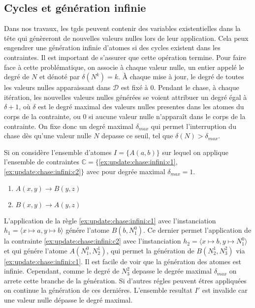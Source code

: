 \subsection{Cycles et génération infinie}
\label{sec:update:chase:infini}
Dans nos travaux, les \glspl{tgd} peuvent contenir des variables existentielles dans la tête qui génèreront de nouvelles valeurs nulles lors de leur application.
Cela peux engendrer une génération infinie d'atomes si des cycles existent dans les contraintes.
Il est important de s'assurer que cette opération termine.
Pour faire face à cette problématique, on associe à chaque valeur nulle, un entier appelé le degré de $N$ et dénoté par $\delta(N^k) = k$.
À chaque mise à jour, le degré de toutes les valeurs nulles apparaissant dans $\mathcal{D}$ est fixé à $0$.
Pendant le \gls{chase}, à chaque itération, les nouvelles valeurs nulles générées se voient attribuer un degré égal à $\delta + 1$, où $\delta$ est le degré maximal des valeurs nulles presentes dans les atomes du corps de la contrainte, ou $0$ si aucune valeur nulle n'apparaît dans le corps de la contrainte.
On fixe donc un degré maximal $\delta_{max}$ qui permet l'interruption du \gls{chase} dès qu'une valeur nulle $N$ depasse ce seuil, tel que $\delta(N) > \delta_{max}$.

\begin{example}
    \label{ex:update:chase:infini}
    Si on considère l'ensemble d'atomes $I = \{A(a, b)\}$ sur lequel on applique l'ensemble de contraintes $\mathbb{C} = \{$\ref{ex:update:chase:infini:c1}, \ref{ex:update:chase:infini:c2}$\}$ avec pour degrée maximal $\delta_{max} = 1$.
    \begin{multicols}{2}
        \begin{enumerate}[label=\textbf{$c_\arabic*$ :},ref=$c_\arabic*$]
            \centering
            \item $A(x, y) \to B(y, z)$ \label{ex:update:chase:infini:c1}
            \item $B(x, y) \to A(y, z)$ \label{ex:update:chase:infini:c2}
        \end{enumerate}
    \end{multicols}

    L'application de la règle \ref{ex:update:chase:infini:c1} avec l'instanciation $h_1 = \langle x \mapsto a, y \mapsto b \rangle$ génére l'atome $B(b, N_1^0)$.
    Ce dernier permet l'application de la contrainte \ref{ex:update:chase:infini:c2} avec l'instanciation $h_2 = \langle x \mapsto b, y \mapsto N_1^0 \rangle$ et qui génére l'atome $A(N_1^0, N_2^1)$, qui permet la génération de $B(N_2^1, N_3^2)$ via \ref{ex:update:chase:infini:c1}.
    Il est facile de voir que la génération des atomes est infinie.
    Cependant, comme le degré de $N_3^2$ depasse le degrée maximal $\delta_{max}$ on arrete cette branche de la génération.
    Si d'autres régles peuvent étres appliquées on continue la génération de ces derniéres.
    L'ensemble resultat $I'$ est invalide car une valeur nulle dépasse le degré maximal.
\end{example}

